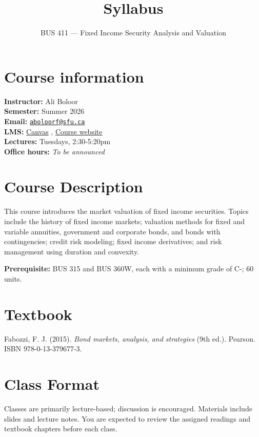 \documentclass[
  letterpaper,
  DIV=11,
  numbers=noendperiod]{scrartcl}
\title{Syllabus}
\subtitle{BUS 411 --- Fixed Income Security Analysis and Valuation}
\author{}
\date{}
\begin{document}
\maketitle


\section{Course information}\label{course-information}

\textbf{Instructor:} Ali Boloor\\
\textbf{Semester:} Summer 2026\\
\textbf{Email:}
\href{mailto:aboloorf@sfu.ca}{\nolinkurl{aboloorf@sfu.ca}}\\
\textbf{LMS:} \href{https://canvas.sfu.ca/}{Canvas} ,
\href{https://aliboloor.github.io/BUS411/}{Course website}\\
\textbf{Lectures:} Tuesdays, 2:30-5:20pm\\
\textbf{Office hours:} \emph{To be announced}

\section{Course Description}\label{course-description}

This course introduces the market valuation of fixed income securities.
Topics include the history of fixed income markets; valuation methods
for fixed and variable annuities, government and corporate bonds, and
bonds with contingencies; credit risk modeling; fixed income
derivatives; and risk management using duration and convexity.

\textbf{Prerequisite:} BUS 315 and BUS 360W, each with a minimum grade
of C-; 60 units.

\section{Textbook}\label{textbook}

Fabozzi, F. J. (2015). \emph{Bond markets, analysis, and strategies}
(9th ed.). Pearson. ISBN 978-0-13-379677-3.

\section{Class Format}\label{class-format}

Classes are primarily lecture-based; discussion is encouraged. Materials
include slides and lecture notes. You are expected to review the
assigned readings and textbook chapters before each class.
\end{document}
